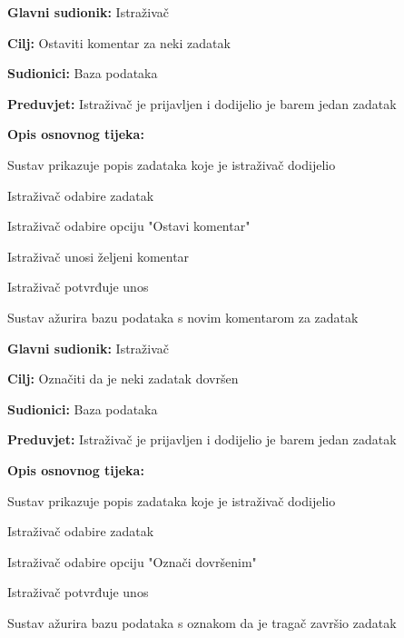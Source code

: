 \begin{packed_item}
\begin{packed_item}
\begin{packed_item}
						\item \textbf{Glavni sudionik:} Istraživač
						\item \textbf{Cilj:} Ostaviti komentar za neki zadatak
						\item \textbf{Sudionici:} Baza podataka
						\item \textbf{Preduvjet:} Istraživač je prijavljen i dodijelio je barem jedan zadatak
						\item \textbf{Opis osnovnog tijeka:}
						
						\item[] \begin{packed_enum}
							
							\item Sustav prikazuje popis zadataka koje je istraživač dodijelio
							\item Istraživač odabire zadatak
							\item Istraživač odabire opciju "Ostavi komentar" 
							\item Istraživač unosi željeni komentar 
							\item Istraživač potvrđuje unos 
							\item Sustav ažurira bazu podataka s novim komentarom za zadatak 
						\end{packed_enum}
					\end{packed_item}
					
					\noindent {}
					\begin{packed_item}
						
						\item \textbf{Glavni sudionik:} Istraživač
						\item \textbf{Cilj:} Označiti da je neki zadatak dovršen
						\item \textbf{Sudionici:} Baza podataka
						\item \textbf{Preduvjet:} Istraživač je prijavljen i dodijelio je barem jedan zadatak
						\item \textbf{Opis osnovnog tijeka:}
						
						\item[] \begin{packed_enum}
							
							\item Sustav prikazuje popis zadataka koje je istraživač dodijelio
							\item Istraživač odabire zadatak
							\item Istraživač odabire opciju "Označi dovršenim" 
							\item Istraživač potvrđuje unos 
							\item Sustav ažurira bazu podataka s oznakom da je tragač završio zadatak 
						\end{packed_enum}
					\end{packed_item}
					

\end{packed_item}
\end{packed_item}
